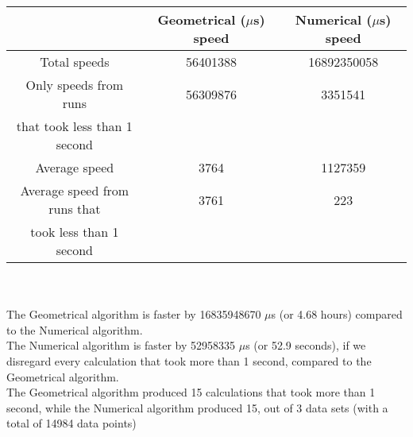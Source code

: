 \begin{tabular}[3]{c|c|c}
 & Geometrical ($\mu$s) speed & Numerical ($\mu$s) speed\\
\hline
Total speeds & 56401388 & 16892350058 \\ 
\hline 
Only speeds from runs & 56309876 & 3351541 \\ 
that took less than 1 second & & \\ 
\hline
Average speed & 3764 & 1127359 \\
\hline
Average speed from runs that & 3761 & 223 \\ 
took less than 1 second & & \\ 
\end{tabular}\\ \\
The Geometrical algorithm is faster by 16835948670 $\mu$s (or 4.68 hours) compared to the Numerical algorithm.\\
The Numerical algorithm is faster by 52958335 $\mu$s (or 52.9 seconds), if we disregard every calculation that took more than 1 second, compared to the Geometrical algorithm.\\
The Geometrical algorithm produced 15 calculations that took more than 1 second, while the Numerical algorithm produced 15, out of 3 data sets (with a total of 14984 data points)\\

